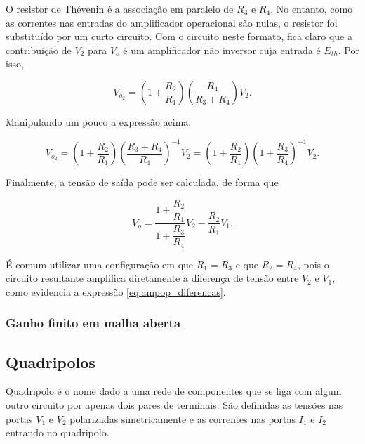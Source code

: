 \documentclass{article}
\numberwithin{equation}{section}
\let\l\left
\let\r\right
\let\dfr\dfrac
\begin{document}
\begin{center}
\end{center}

\noindent O resistor de Thévenin é a associação em paralelo de $R_3$ e $R_4$. No entanto, como as correntes nas entradas do amplificador operacional são nulas, o resistor foi substituído por um curto circuito. Com o circuito neste formato, fica claro que a contribuição de $V_2$ para $V_o$ é um amplificador não inversor cuja entrada é $E_{th}$. Por isso,

\begin{equation}
    V_{o_2} = \l(1+\dfr{R_2}{R_1}\r) \l(\dfr{R_4}{R_3+R_4}\r) V_2.
\end{equation}

\noindent Manipulando um pouco a expressão acima,

\begin{equation}
    V_{o_2} = \l(1+\dfr{R_2}{R_1}\r) \l(\dfr{R_3+R_4}{R_4}\r)^{-1} V_2 = \l(1+\dfr{R_2}{R_1}\r) \l(1+\dfr{R_3}{R_4}\r)^{-1} V_2.
\end{equation}

\noindent Finalmente, a tensão de saída pode ser calculada, de forma que

\begin{equation}
    V_o = \dfr{1+\dfr{R_2}{R_1}}{1+\dfr{R_3}{R_4}}V_2 - \dfr{R_2}{R_1}V_1.
\end{equation}

\noindent É comum utilizar uma configuração em que $R_1=R_3$ e que $R_2=R_4$, pois o circuito resultante amplifica diretamente a diferença de tensão entre $V_2$ e $V_1$, como evidencia a expressão \eqref{eq:ampop_diferencas}.

\subsubsection{Ganho finito em malha aberta}
\label{subsubsec:ganho finito}

\subsection{Quadripolos}
\label{subsec:quadripolos}
Quadripolo é o nome dado a uma rede de componentes que se liga com algum outro circuito por apenas dois pares de terminais. São definidas as tensões nas portas $V_{1}$ e $V_{2}$ polarizadas simetricamente e as correntes nas portas $I_{1}$ e $I_{2}$ entrando no quadripolo.
\end{document}
